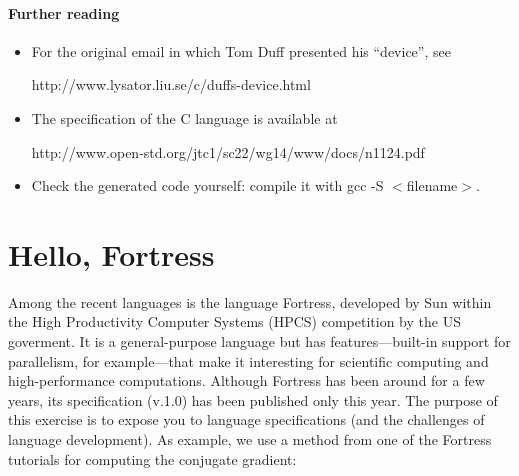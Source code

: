 \documentclass{article}
\newcommand{\percent}[1]{\protect \marginpar[l]{\bf [#1 points]}}
\begin{document}
\paragraph{Further reading}
\begin{itemize}
\item For the original email in which Tom Duff presented his ``device'',
see 

\textsf{http://www.lysator.liu.se/c/duffs-device.html}
\item The specification of the C language is available at 

\textsf{http://www.open-std.org/jtc1/sc22/wg14/www/docs/n1124.pdf}
\item Check the generated code yourself: compile it
with \textsf{gcc -S $<$filename$>$}.
\end{itemize}


\section{Hello, Fortress \percent{25}}
Among the recent languages is the language \textsf{Fortress}, developed
by Sun within the \textsf{High Productivity Computer Systems (HPCS)}
competition by the US goverment. It is a general-purpose language but has
features---built-in support for parallelism, for example---that make it
interesting for scientific computing and high-performance computations.
Although \textsf{Fortress} has been around for a few years, its
specification (v.1.0) has been published only this year. The purpose of
this exercise is to expose you to language specifications (and the
challenges of language development). As example, we use a method from one
of the Fortress tutorials for computing the conjugate gradient:
%
\end{document}

